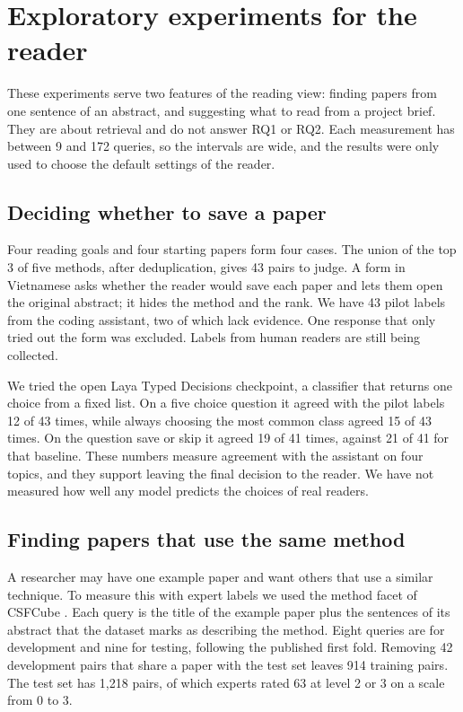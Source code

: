 \documentclass[11pt,a4paper]{article}
\begin{document}
\clearpage



\clearpage
\appendix
\section{Exploratory experiments for the reader}\label{app:reader}
These experiments serve two features of the reading view: finding papers from one sentence of an abstract, and suggesting what to read from a project brief. They are about retrieval and do not answer RQ1 or RQ2. Each measurement has between 9 and 172 queries, so the intervals are wide, and the results were only used to choose the default settings of the reader.

\subsection{Deciding whether to save a paper}
Four reading goals and four starting papers form four cases. The union of the top 3 of five methods, after deduplication, gives 43 pairs to judge. A form in Vietnamese asks whether the reader would save each paper and lets them open the original abstract; it hides the method and the rank. We have 43 pilot labels from the coding assistant, two of which lack evidence. One response that only tried out the form was excluded. Labels from human readers are still being collected.

We tried the open Laya Typed Decisions checkpoint, a classifier that returns one choice from a fixed list. On a five choice question it agreed with the pilot labels 12 of 43 times, while always choosing the most common class agreed 15 of 43 times. On the question save or skip it agreed 19 of 41 times, against 21 of 41 for that baseline. These numbers measure agreement with the assistant on four topics, and they support leaving the final decision to the reader. We have not measured how well any model predicts the choices of real readers.

\subsection{Finding papers that use the same method}
A researcher may have one example paper and want others that use a similar technique. To measure this with expert labels we used the method facet of CSFCube \citep{mysore2021csfcube}. Each query is the title of the example paper plus the sentences of its abstract that the dataset marks as describing the method. Eight queries are for development and nine for testing, following the published first fold. Removing 42 development pairs that share a paper with the test set leaves 914 training pairs. The test set has 1,218 pairs, of which experts rated 63 at level 2 or 3 on a scale from 0 to 3.
\end{document}
